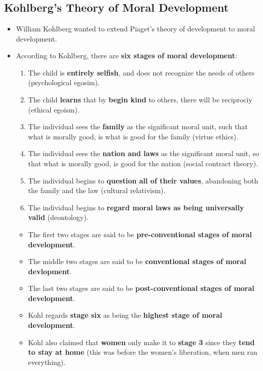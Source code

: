 \documentclass{article}
\begin{document}
    \section*{}

    \subsection*{Kohlberg's Theory of Moral Development}
    \begin{itemize}
        \item William Kohlberg wanted to extend Piaget's theory of development to moral development.
        \item According to Kohlberg, there are \textbf{six stages of moral development}:
        \begin{enumerate}
            \item The child is \textbf{entirely selfish}, and does not recognize the needs of others (psychological egosim).
            \item The child \textbf{learns} that by \textbf{begin kind} to others, there will be reciprociy (ethical egoism).
            \item The individual sees the \textbf{family} as the significant moral unit, such that what is morally good, is what is good for the family (virtue ethics).
            \item The individual sees the \textbf{nation and laws} as the significant moral unit, so that what is morally good, is good for the nation (social contract theory).
            \item The individual begins to \textbf{question all of their values}, abandoning both the family and the law (cultural relativism).
            \item The individual begins to \textbf{regard moral laws as being universally valid} (deontology). 
        \end{enumerate}
        \begin{itemize}
            \item The first two stages are said to be \textbf{pre-conventional stages of moral development}.
            \item The middle two stages are said to be \textbf{conventional stages of moral devlopment}.
            \item The last two stages are said to be \textbf{post-conventional stages of moral development}.
            \item Kohl regards \textbf{stage six} as being the \textbf{highest stage of moral development}.
            \item Kohl also claimed that \textbf{women} only make it to \textbf{stage 3} since they \textbf{tend to stay at home} (this was before the women's liberation, when men ran everything).
        \end{itemize}
    \end{itemize}
\end{document}
